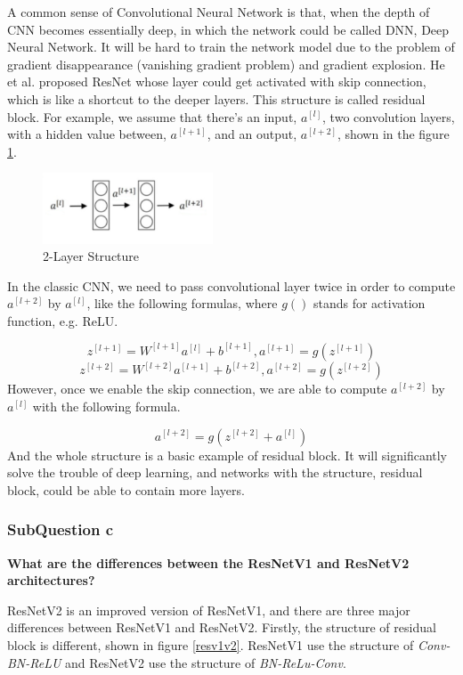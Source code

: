 \documentclass[conference]{IEEEtran}
\begin{document}
A common sense of Convolutional Neural Network is that, when the depth of CNN becomes essentially deep, in which the network could be called DNN, Deep Neural Network. It will be hard to train the network model due to the problem of gradient disappearance (vanishing gradient problem) and gradient explosion. He et al.\cite{resnet} proposed ResNet whose layer could get activated with skip connection, which is like a shortcut to the deeper layers. This structure is called residual block. For example, we assume that there's an input, $a^{[l]}$, two convolution layers, with a hidden value between, $a^{[l+1]}$, and an output, $a^{[l+2]}$, shown in the figure \ref{resex}\cite{wu}.

\begin{figure}[h] 
    \centering
    \includegraphics[width=0.45\textwidth]{./graphs/Task2/resnet-example.png}
    \caption{2-Layer Structure}
    \label{resex}
\end{figure}

In the classic CNN, we need to pass convolutional layer twice in order to compute $a^{[l+2]}$ by $a^{[l]}$, like the following formulas, where $g()$ stands for activation function, e.g. ReLU.

$$z^{[l+1]}=W^{[l+1]}a^{[l]}+b^{[l+1]}, a^{[l+1]}=g(z^{[l+1]})$$
$$z^{[l+2]}=W^{[l+2]}a^{[l+1]}+b^{[l+2]}, a^{[l+2]}=g(z^{[l+2]})$$
However, once we enable the skip connection, we are able to compute $a^{[l+2]}$ by $a^{[l]}$ with the following formula.

$$a^{[l+2]}=g(z^{[l+2]}+a^{[l]})$$
And the whole structure is a basic example of residual block. It will significantly solve the trouble of deep learning, and networks with the structure, residual block, could be able to contain more layers.

\subsubsection{SubQuestion c} \textbf{What are the differences between the ResNetV1 and ResNetV2 architectures?}

ResNetV2 is an improved version of ResNetV1, and there are three major differences between ResNetV1 and ResNetV2. Firstly, the structure of residual block is different, shown in figure \ref{resv1v2}.\cite{v1v2} ResNetV1 use the structure of \textit{Conv-BN-ReLU} and ResNetV2 use the structure of \textit{BN-ReLu-Conv}.
\end{document}
